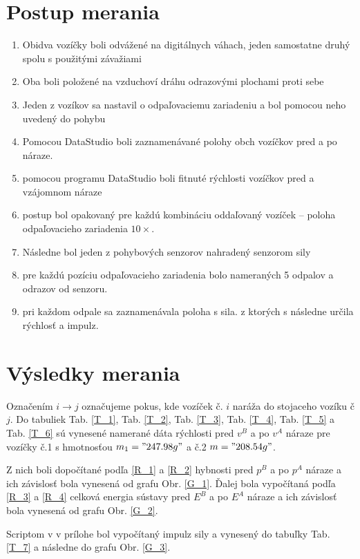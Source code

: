 \documentclass[a4paper,10pt]{article}
\begin{document}
\section{Postup merania}
\begin{enumerate}
\item Obidva vozíčky boli odvážené na digitálnych váhach, jeden samostatne druhý spolu s použitými závažiami
\item Oba boli položené na vzduchoví dráhu odrazovými plochami proti sebe
\item Jeden z vozíkov sa nastavil o odpaľovaciemu zariadeniu a bol pomocou neho uvedený do pohybu
\item Pomocou DataStudio boli zaznamenávané polohy obch vozíčkov pred a po náraze.
\item pomocou programu DataStudio boli fitnuté rýchlosti vozíčkov pred a vzájomnom náraze
\item postup bol opakovaný pre každú kombináciu oddaľovaný vozíček -- poloha odpaľovacieho zariadenia $10 \times$.
\item Následne bol jeden z pohybových senzorov nahradený senzorom sily
\item pre každú pozíciu odpaľovacieho zariadenia bolo nameraných 5 odpalov a odrazov od senzoru.
\item pri každom odpale sa zaznamenávala poloha s sila. z ktorých s následne určila rýchlosť a impulz.
\end{enumerate}



\section{Výsledky merania}
Označením $i\rightarrow j$ označujeme pokus, kde vozíček č. $i$ naráža do stojaceho vozíku č $j$.
Do tabuliek Tab. \ref{T_1}, Tab. \ref{T_2}, Tab. \ref{T_3}, Tab. \ref{T_4}, Tab. \ref{T_5} a Tab. \ref{T_6} 
sú vynesené namerané dáta rýchlosti pred $v^B$ a po $v^A$ náraze pre vozíčky č.1 s hmotnosťou $m_1="247.98 g"$ a č.2 $m = "208.54 g"$.

Z nich boli dopočítané podľa \ref{R_1} a \ref{R_2} hybnosti pred $p^B$ a po $p^A$ náraze a ich závislosť bola vynesená od grafu Obr. \ref{G_1}. 
Ďalej bola vypočítaná podľa \ref{R_3} a \ref{R_4} celková energia sústavy pred $E^B$ a po $E^A$ náraze a ich závislosť bola vynesená od grafu Obr. \ref{G_2}.

Scriptom v v prílohe bol vypočítaný impulz sily a vynesený do tabuľky Tab. \ref{T_7} a následne do grafu Obr. \ref{G_3}.
\end{document}
